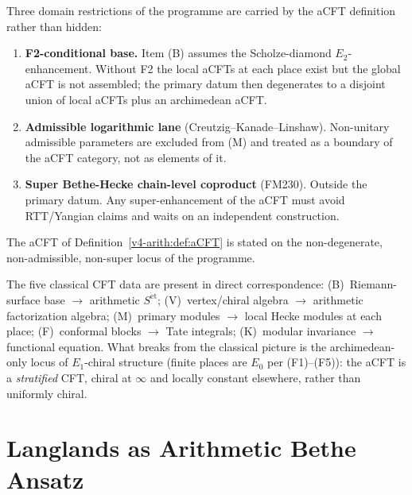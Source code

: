 \begin{remark}
\label{v4-arith:rem:aCFT-domain}
Three domain restrictions of the programme are carried by the aCFT
definition rather than hidden:
\begin{enumerate}
\item \textbf{F2-conditional base.} Item (B) assumes the
Scholze-diamond \(E_{2}\)-enhancement. Without F2 the local aCFTs at
each place exist but the global aCFT is not assembled; the primary
datum then degenerates to a disjoint union of local aCFTs plus an
archimedean aCFT.
\item \textbf{Admissible logarithmic lane} (Creutzig--Kanade--Linshaw).
Non-unitary admissible parameters are excluded from (M) and treated
as a boundary of the aCFT category, not as elements of it.
\item \textbf{Super Bethe-Hecke chain-level coproduct} (FM230).
Outside the primary datum. Any super-enhancement of the aCFT must
avoid RTT/Yangian claims and waits on an independent construction.
\end{enumerate}
The aCFT of Definition~\ref{v4-arith:def:aCFT} is stated on the
non-degenerate, non-admissible, non-super locus of the programme.
\end{remark}

\begin{remark}
The five classical CFT data are present in direct correspondence:
(B)~Riemann-surface base \(\to\) arithmetic \(S^{\mathrm{\acute{e}t}}\);
(V)~vertex/chiral algebra \(\to\) arithmetic factorization algebra;
(M)~primary modules \(\to\) local Hecke modules at each place;
(F)~conformal blocks \(\to\) Tate integrals;
(K)~modular invariance \(\to\) functional equation. What breaks from
the classical picture is the archimedean-only locus of
\(E_{1}\)-chiral structure (finite places are \(E_{0}\) per (F1)--(F5)):
the aCFT is a \emph{stratified} CFT, chiral at \(\infty\) and
locally constant elsewhere, rather than uniformly chiral.
\end{remark}

\section{Langlands as Arithmetic Bethe Ansatz}
\label{v4-arith:syn:langlands-bethe}

